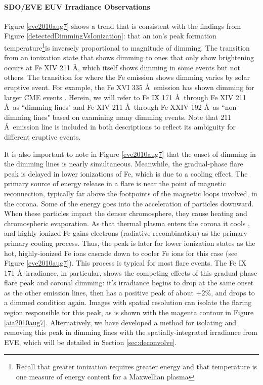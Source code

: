 \paragraph{SDO/EVE EUV Irradiance Observations}
Figure \ref{eve2010aug7} shows a trend that is consistent with the findings from Figure \ref{detectedDimmingVsIonization}: that an ion's peak formation temperature\footnote{Recall that greater ionization requires greater energy and that temperature is one measure of energy content for a Maxwellian plasma}is inversely proportional to magnitude of dimming. The transition from an ionization state that shows dimming to ones that only show brightening occurs at Fe XIV 211 \AA, which itself shows dimming in some events but not others. The transition for where the Fe emission shows dimming varies by solar eruptive event. For example, the Fe XVI 335 \AA\ emission has shown dimming for larger CME events \citep{Woods2011}. Herein, we will refer to Fe IX 171 \AA\ through Fe XIV 211 \AA\ as ``dimming lines" and Fe XIV 211 \AA\ through Fe XXIV 192 \AA\ as ``non-dimming lines" based on examining many dimming events. Note that 211 \AA\ emission line is included in both descriptions to reflect its ambiguity for different eruptive events.

It is also important to note in Figure \ref{eve2010aug7} that the onset of dimming in the dimming lines is nearly simultaneous. Meanwhile, the gradual-phase flare peak is delayed in lower ionizations of Fe, which is due to a cooling effect. The primary source of energy release in a flare is near the point of magnetic reconnection, typically far above the footpoints of the magnetic loops involved, in the corona. Some of the energy goes into the acceleration of particles downward. When these particles impact the denser chromosphere, they cause heating and chromospheric evaporation. As that thermal plasma enters the corona it cools \citep{Fletcher2011}, and highly ionized Fe gains electrons (radiative recombination) as the primary primary cooling process. Thus, the peak is later for lower ionization states as the hot, highly-ionized Fe ions cascade down to cooler Fe ions for this case (see Figure \ref{eve2010aug7}). This process is typical for most flare events. The Fe IX 171 \AA\ irradiance, in particular, shows the competing effects of this gradual phase flare peak and coronal dimming: it's irradiance begins to drop at the same onset as the other emission lines, then has a positive peak of about +2\%, and drops to a dimmed condition again. Images with spatial resolution can isolate the flaring region responsible for this peak, as is shown with the magenta contour in Figure \ref{aia2010aug7}. Alternatively, we have developed a method for isolating and removing this peak in dimming lines with the spatially-integrated irradiance from EVE, which will be detailed in Section \ref{sec:deconvolve}. 

